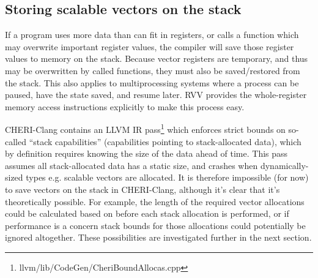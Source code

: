 \documentclass[../thesis]{subfiles}
\begin{document}

\subsection{Storing scalable vectors on the stack}
If a program uses more data than can fit in registers, or calls a function which may overwrite important register values, the compiler will save those register values to memory on the stack.
Because vector registers are temporary, and thus may be overwritten by called functions, they must also be saved/restored from the stack.
This also applies to multiprocessing systems where a process can be paused, have the state saved, and resume later.
RVV provides the whole-register memory access instructions explicitly to make this process easy.

CHERI-Clang contains an LLVM IR pass\footnote{llvm/lib/CodeGen/CheriBoundAllocas.cpp} which enforces strict bounds on so-called ``stack capabilities'' (capabilities pointing to stack-allocated data), which by definition requires knowing the size of the data ahead of time.
This pass assumes all stack-allocated data has a static size, and crashes when dynamically-sized types e.g. scalable vectors are allocated.
It is therefore impossible (for now) to save vectors on the stack in CHERI-Clang, although it's clear that it's theoretically possible.
For example, the length of the required vector allocations could be calculated based on  before each stack allocation is performed, or if performance is a concern stack bounds for those allocations could potentially be ignored altogether.
These possibilities are investigated further in the next section.



\pagebreak


\end{document}
